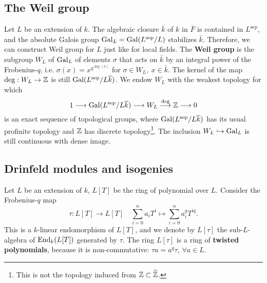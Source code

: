 \documentclass{article}
\newcommand{\sep}{\mathrm{sep}}
\DeclareMathOperator{\frob}{Frob}
\begin{document}
\subsection{The Weil group}
Let $L$ be an extension of $k$.
The algebraic closure $\bar k$ of $k$ in $\bar F$ is contained in $L^\sep$,
and the absolute Galois group $\gal_L = \gal(L^\sep/L)$ stabilizes $\bar k$.
Therefore, we can construct Weil group for $L$ just like for local fields.
The \textbf{Weil group} is the subgroup $W_L$ of $\operatorname{Gal}_L$ of elements $\sigma$ that acts on $\bar{k}$ by an integral power of the Frobenius-$q$, i.e. $\sigma(x) = x^{q^{\deg(\sigma)}}$ for $\sigma\in W_L,\ x\in\bar{k}$.
The kernel of the map $\deg : W_L\to\mathbb{Z}$ is still $\gal(L^\sep/L\bar{k})$.
We endow $W_L$ with the weakest topology for which
\[1\longrightarrow \gal(L^\sep/L\bar{k})\longrightarrow W_L\stackrel{\deg}{\longrightarrow} \Z\longrightarrow0\]
is an exact sequence of topological groups,
where $\gal(L^\sep/L\bar{k})$ has its usual profinite topology and $\mathbb{Z}$ has discrete topology\footnote{This is not the topology induced from $\mathbb{Z}\subset \widehat{\mathbb{Z}}$.}.
The inclusion $W_L\hookrightarrow \operatorname{Gal}_L$ is still continuous with dense image.

\subsection{Drinfeld modules and isogenies}

Let $L$ be an extension of $k$, $L[T]$ be the ring of polynomial over $L$.
Consider the Frobenius-$q$ map \[\tau : L[T]\to L[T]\quad \sum_{i = 0}^n a_iT^i\mapsto \sum_{i = 0}^n a_i^qT^{iq}.\]
This is a $k$-linear endomorphism of $L[T]$,
and we denote by $L[\tau]$ the sub-$L$-algebra of $\operatorname{End}_{k}(L[T])$ generated by $\tau$.
The ring $L[\tau]$ is a ring of \textbf{twisted polynomials},
because it is non-commutative: $\tau a = a^q\tau$, $\forall a\in L$.
\end{document}
